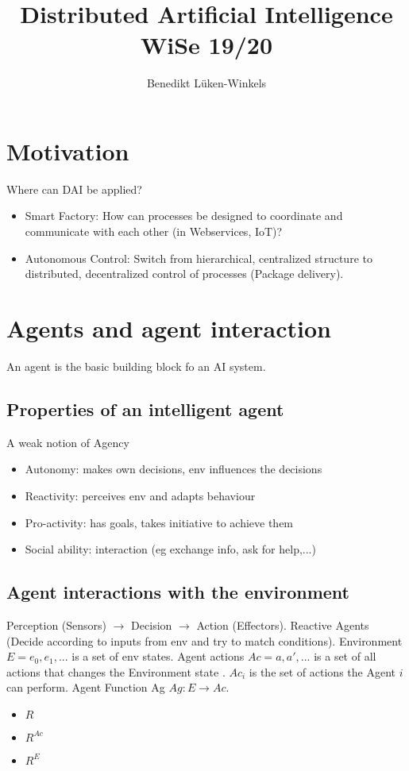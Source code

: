 \documentclass[ngerman]{scrartcl}
\title{Distributed Artificial Intelligence \\ WiSe 19/20}
\author{Benedikt Lüken-Winkels}
\begin{document}
\maketitle
\tableofcontents
\newpage


\section{Motivation}
Where can DAI be applied?
\begin{itemize}
    \item Smart Factory: How can processes be designed to coordinate and communicate with each other (in Webservices, IoT)?
    \item Autonomous Control: Switch from hierarchical, centralized structure to distributed, decentralized control of processes (Package delivery).
\end{itemize}

\section{Agents and agent interaction}
An agent is the basic building block fo an AI system.
\subsection*{Properties of an intelligent agent}
A weak notion of Agency
\begin{itemize}
    \item Autonomy: makes own decisions, env influences the decisions
    \item Reactivity: perceives env and adapts behaviour
    \item Pro-activity: has goals, takes initiative to achieve them
    \item Social ability: interaction (eg exchange info, ask for help,...)
\end{itemize}

\subsection*{Agent interactions with the environment}
Perception (Sensors) $ \rightarrow $ Decision $ \rightarrow $ Action (Effectors). Reactive Agents (Decide according to inputs from env and try to match conditions). Environment $ E = {e_0, e_1, ...} $ is a set of env states. Agent actions $ Ac = {a, a', ...} $ is a set of all actions that changes the Environment state . $ Ac_i $ is the set of actions the Agent $ i $ can perform. Agent Function Ag $ Ag: E \rightarrow Ac $. 
\begin{itemize}
    \item $ R $
    \item $ R^{Ac} $
    \item $ R^E $
\end{itemize} 
\end{document}
